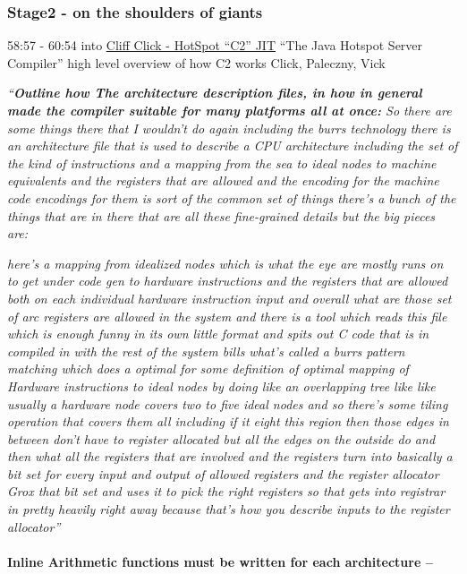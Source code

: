 \hypertarget{stage2---on-the-shoulders-of-giants}{%
\subsubsection{Stage2 - on the shoulders of
giants}\label{stage2---on-the-shoulders-of-giants}}

58:57 - 60:54 into \href{https://youtu.be/9epgZ-e6DUU}{Cliff Click -
HotSpot ``C2'' JIT} ``The Java Hotspot Server Compiler'' high level
overview of how C2 works Click, Paleczny, Vick

\emph{``\textbf{Outline how The architecture description files, in how
in general made the compiler suitable for many platforms all at once:}
So there are some things there that I wouldn't do again including the
burrs technology there is an architecture file that is used to describe
a CPU architecture including the set of the kind of instructions and a
mapping from the sea to ideal nodes to machine equivalents and the
registers that are allowed and the encoding for the machine code
encodings for them is sort of the common set of things there's a bunch
of the things that are in there that are all these fine-grained details
but the big pieces are:}

\emph{here's a mapping from idealized nodes which is what the eye are
mostly runs on to get under code gen to hardware instructions and the
registers that are allowed both on each individual hardware instruction
input and overall what are those set of arc registers are allowed in the
system and there is a tool which reads this file which is enough funny
in its own little format and spits out C code that is in compiled in
with the rest of the system bills what's called a burrs pattern matching
which does a optimal for some definition of optimal mapping of Hardware
instructions to ideal nodes by doing like an overlapping tree like like
usually a hardware node covers two to five ideal nodes and so there's
some tiling operation that covers them all including if it eight this
region then those edges in between don't have to register allocated but
all the edges on the outside do and then what all the registers that are
involved and the registers turn into basically a bit set for every input
and output of allowed registers and the register allocator Grox that bit
set and uses it to pick the right registers so that gets into registrar
in pretty heavily right away because that's how you describe inputs to
the register allocator''}

\hypertarget{inline-arithmetic-functions-must-be-written-for-each-architecture}{%
\paragraph{Inline Arithmetic functions must be written for each
architecture
--}\label{inline-arithmetic-functions-must-be-written-for-each-architecture}}

